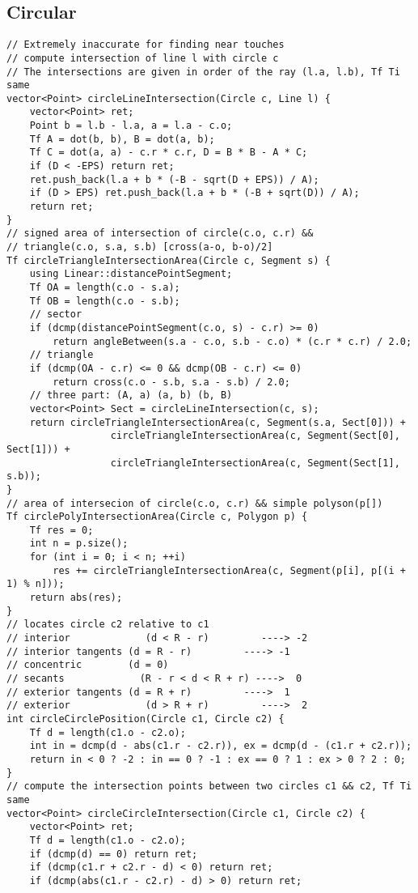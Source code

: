 \documentclass[FSZ,a4paper,onesided]{article}
\begin{document}
\begin{multicols*}{\COLS}
\subsection{Circular}
\begin{lstlisting}
// Extremely inaccurate for finding near touches
// compute intersection of line l with circle c
// The intersections are given in order of the ray (l.a, l.b), Tf Ti same
vector<Point> circleLineIntersection(Circle c, Line l) {
    vector<Point> ret;
    Point b = l.b - l.a, a = l.a - c.o;
    Tf A = dot(b, b), B = dot(a, b);
    Tf C = dot(a, a) - c.r * c.r, D = B * B - A * C;
    if (D < -EPS) return ret;
    ret.push_back(l.a + b * (-B - sqrt(D + EPS)) / A);
    if (D > EPS) ret.push_back(l.a + b * (-B + sqrt(D)) / A);
    return ret;
}
// signed area of intersection of circle(c.o, c.r) &&
// triangle(c.o, s.a, s.b) [cross(a-o, b-o)/2]
Tf circleTriangleIntersectionArea(Circle c, Segment s) {
    using Linear::distancePointSegment;
    Tf OA = length(c.o - s.a);
    Tf OB = length(c.o - s.b);
    // sector
    if (dcmp(distancePointSegment(c.o, s) - c.r) >= 0)
        return angleBetween(s.a - c.o, s.b - c.o) * (c.r * c.r) / 2.0;
    // triangle
    if (dcmp(OA - c.r) <= 0 && dcmp(OB - c.r) <= 0)
        return cross(c.o - s.b, s.a - s.b) / 2.0;
    // three part: (A, a) (a, b) (b, B)
    vector<Point> Sect = circleLineIntersection(c, s);
    return circleTriangleIntersectionArea(c, Segment(s.a, Sect[0])) +
                  circleTriangleIntersectionArea(c, Segment(Sect[0], Sect[1])) +
                  circleTriangleIntersectionArea(c, Segment(Sect[1], s.b));
}
// area of intersecion of circle(c.o, c.r) && simple polyson(p[])
Tf circlePolyIntersectionArea(Circle c, Polygon p) {
    Tf res = 0;
    int n = p.size();
    for (int i = 0; i < n; ++i)
        res += circleTriangleIntersectionArea(c, Segment(p[i], p[(i + 1) % n]));
    return abs(res);
}
// locates circle c2 relative to c1
// interior             (d < R - r)         ----> -2
// interior tangents (d = R - r)         ----> -1
// concentric        (d = 0)
// secants             (R - r < d < R + r) ---->  0
// exterior tangents (d = R + r)         ---->  1
// exterior             (d > R + r)         ---->  2
int circleCirclePosition(Circle c1, Circle c2) {
    Tf d = length(c1.o - c2.o);
    int in = dcmp(d - abs(c1.r - c2.r)), ex = dcmp(d - (c1.r + c2.r));
    return in < 0 ? -2 : in == 0 ? -1 : ex == 0 ? 1 : ex > 0 ? 2 : 0;
}
// compute the intersection points between two circles c1 && c2, Tf Ti same
vector<Point> circleCircleIntersection(Circle c1, Circle c2) {
    vector<Point> ret;
    Tf d = length(c1.o - c2.o);
    if (dcmp(d) == 0) return ret;
    if (dcmp(c1.r + c2.r - d) < 0) return ret;
    if (dcmp(abs(c1.r - c2.r) - d) > 0) return ret;


\end{lstlisting}
\end{multicols*}
\end{document}
